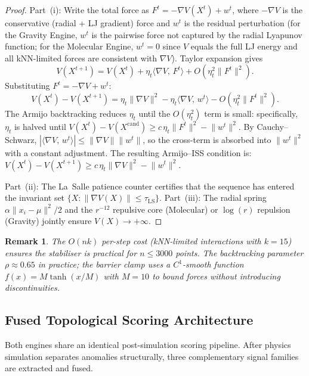 \documentclass[final]{siamltex}
\newcommand{\norm}[1]{\lVert #1 \rVert}
\newcommand{\inner}[2]{\langle #1,\, #2 \rangle}
\providecommand{\grad}{\nabla}
\newtheorem{remark}[theorem]{Remark}
\begin{document}
\begin{proof}
Part~(i): Write the total force as $F^t = -\grad V(X^t) + w^t$,
where $-\grad V$ is the conservative (radial + LJ gradient) force
and $w^t$ is the residual perturbation (for the Gravity Engine,
$w^t$ is the pairwise force not captured by the radial Lyapunov
function; for the Molecular Engine, $w^t = 0$ since $V$ equals
the full LJ energy and all kNN-limited forces are consistent with
$\grad V$).  Taylor expansion gives
\[
  V(X^{t+1}) = V(X^t) + \eta_t\inner{\grad V}{F^t}
  + O(\eta_t^2\norm{F^t}^2).
\]
Substituting $F^t = -\grad V + w^t$:
\[
  V(X^t) - V(X^{t+1})
  = \eta_t\norm{\grad V}^2 - \eta_t\inner{\grad V}{w^t}
  - O(\eta_t^2\norm{F^t}^2).
\]
The Armijo backtracking reduces $\eta_t$ until the $O(\eta_t^2)$
term is small: specifically, $\eta_t$ is halved until
$V(X^t) - V(X^{\mathrm{cand}}) \ge c\,\eta_t\norm{F^t}^2
- \norm{w^t}^2$.  By Cauchy--Schwarz,
$|\inner{\grad V}{w^t}| \le \norm{\grad V}\norm{w^t}$, so the
cross-term is absorbed into $\norm{w^t}^2$ with a constant
adjustment.  The resulting Armijo--ISS condition is:
$V(X^t) - V(X^{t+1}) \ge c\,\eta_t\norm{\grad V}^2 - \norm{w^t}^2$.

Part~(ii): The La~Salle patience counter certifies that the
sequence has entered the invariant set
$\{X : \norm{\grad V(X)} \le \tau_{\mathrm{LS}}\}$.
Part~(iii): The radial spring $\alpha\norm{x_i - \mu}^2 / 2$
and the $r^{-12}$ repulsive core (Molecular) or $\log(r)$
repulsion (Gravity) jointly ensure $V(X) \to +\infty$.
\end{proof}

\begin{remark}\label{rem:convergence}
The $O(nk)$ per-step cost (kNN-limited interactions with $k = 15$)
ensures the stabiliser is practical for $n \le 3000$ points.
The backtracking parameter $\rho \approx 0.65$ in practice;
the barrier clamp uses a $C^1$-smooth function
$f(x) = M\tanh(x/M)$ with $M = 10$ to bound forces without
introducing discontinuities.
\end{remark}

\subsection{Fused Topological Scoring Architecture}\label{sec:fused}

Both engines share an identical post-simulation scoring pipeline.
After physics simulation separates anomalies structurally, three
complementary signal families are extracted and fused.
\end{document}
